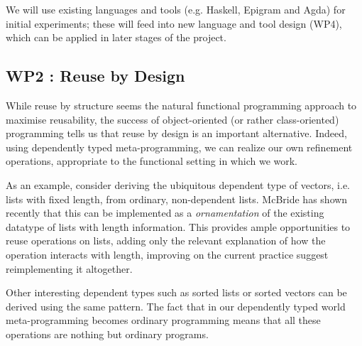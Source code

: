 \documentclass[a4paper]{article}
\begin{document}

We will use existing languages and tools (e.g. Haskell, Epigram and
Agda) for initial experiments; these will feed into new language and
tool design (WP4), which can be applied in later stages of the
project.



\subsection*{WP2 : Reuse by Design}
\label{sec:reuse-design}

While reuse by structure seems the natural functional programming
approach to maximise reusability, the success of object-oriented
(or rather class-oriented) programming 
tells us that reuse by design
is an important alternative. Indeed, using dependently typed
meta-programming, we can realize our own refinement operations,
appropriate to the functional setting in which we work.

As an example, consider deriving the ubiquitous dependent type of
vectors, i.e. lists with fixed length, from ordinary, non-dependent
lists. 
McBride
has shown recently \cite{conor:DTP08} that this can be
implemented
as a \emph{ornamentation} of the existing datatype of
lists with length information.
This provides ample opportunities to reuse operations
on lists, adding only the relevant explanation of how the operation
interacts with length, improving on the current practice suggest reimplementing it altogether. 

Other interesting dependent types such
as sorted lists or sorted vectors can be derived using the same
pattern. The fact that in our dependently typed world meta-programming
becomes ordinary programming means that all these operations are
nothing but ordinary programs.
\end{document}
